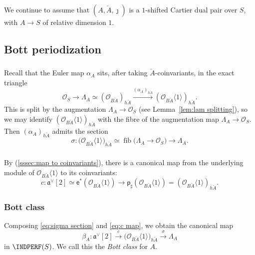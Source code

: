 \documentclass[12pt, oneside]{amsart}
\numberwithin{equation}{section}
\theoremstyle{remark}
\theoremstyle{plain}
\newcommand{\frav}{\mathfrak{a}^\vee}
\newcommand{\lam}{\Lambda}
\newcommand{\OO}{\mathcal{O}}
\newcommand{\Thom}[1]{\langle #1 \rangle}
\newcommand{\sfp}{\mathsf{p}}
\newcommand{\sfe}{\mathsf{e}}
\begin{document}
We continue to assume that $(A, \check{A}, \jmath)$ is a $1$-shifted Cartier dual pair over $S$, with $A \to S$ of relative dimension $1$.

\subsection{Bott periodization}\label{ssec:Bott periodization}

\subsubsection{}

Recall that the Euler map $\alpha_A$ sits, after taking $\check{A}$-coinvariants, in the exact triangle
\[
  \OO_S
  \to \lam_A
  \simeq (\OO_{B\check{A}})_{h\check{A}}
  \xrightarrow{(\alpha_A)_{h\check{A}}} (\OO_{B\check{A}}\Thom{1})_{h\check{A}}.
\]
This is split by the augmentation $\lam_A \to \OO_S$ (see Lemma~\ref{lem:lam splitting}), so we may identify $(\OO_{B\check{A}}\Thom{1})_{h\check{A}}$ with the fibre of the augmentation map $\lam_A \to \OO_S$.
Then $(\alpha_A)_{h\check{A}}$ admits the section
\begin{equation}\label{eq:sigma section}
  \sigma : \bigl(\OO_{B\check{A}}\Thom{1}\bigr)_{h\check{A}}
  \simeq \operatorname{fib}\bigl(\lam_A \to \OO_S\bigr)
  \longrightarrow \lam_A.
\end{equation}

\subsubsection{}

By (\ref{sssec:map to coinvariants}), there is a canonical map from the underlying module of $\OO_{B\check{A}}\Thom{1}$ to its coinvariants:
\begin{equation}\label{eq:c map}
	c : \frav[2] \simeq \sfe^* (\OO_{B\check{A}}\Thom{1}) \to \sfp_\sharp(\OO_{B\check{A}}\Thom{1}) = (\OO_{B\check{A}}\Thom{1})_{h\check{A}}.
\end{equation}

\subsubsection{Bott class}

Composing \eqref{eq:sigma section} and \eqref{eq:c map}, we obtain the canonical map
\begin{equation}\label{eq:Bott class}
	\beta_A : \frav[2] \xrightarrow{c} \bigl(\OO_{B\check{A}}\Thom{1}\bigr)_{h\check{A}} \xrightarrow{\sigma} \lam_A
\end{equation}
in $\INDPERF(S)$.
We call this the \emph{Bott class} for $A$.
\end{document}
